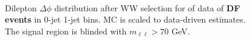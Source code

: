 \begin{figure}[!hbtp]
\centering
{}
 \\
\caption{Dilepton $\Delta\phi$ distribution after WW selection for \intlumiEightTeV of data 
of {\bf DF events} in 0-jet  1-jet  bins.   
MC is scaled to data-driven estimates.
The signal region is blinded with $m_{\ell\ell}>70$ GeV. }
\label{fig:ww_deltaphi}
\end{figure}

